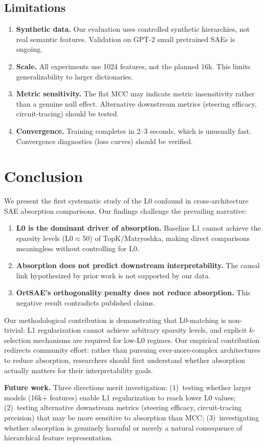 \documentclass{article}
\begin{document}
\subsection{Limitations}

\begin{enumerate}
    \item \textbf{Synthetic data.} Our evaluation uses controlled synthetic hierarchies, not real semantic features. Validation on GPT-2 small pretrained SAEs is ongoing.
    \item \textbf{Scale.} All experiments use 1024 features, not the planned 16k. This limits generalizability to larger dictionaries.
    \item \textbf{Metric sensitivity.} The flat MCC may indicate metric insensitivity rather than a genuine null effect. Alternative downstream metrics (steering efficacy, circuit-tracing) should be tested.
    \item \textbf{Convergence.} Training completes in 2--3 seconds, which is unusually fast. Convergence diagnostics (loss curves) should be verified.
\end{enumerate}

\section{Conclusion}

We present the first systematic study of the L0 confound in cross-architecture SAE absorption comparisons. Our findings challenge the prevailing narrative:
\begin{enumerate}
    \item \textbf{L0 is the dominant driver of absorption.} Baseline L1 cannot achieve the sparsity levels (L0$\approx$50) of TopK/Matryoshka, making direct comparisons meaningless without controlling for L0.
    \item \textbf{Absorption does not predict downstream interpretability.} The causal link hypothesized by prior work is not supported by our data.
    \item \textbf{OrtSAE's orthogonality penalty does not reduce absorption.} This negative result contradicts published claims.
\end{enumerate}

Our methodological contribution is demonstrating that L0-matching is non-trivial: L1 regularization cannot achieve arbitrary sparsity levels, and explicit $k$-selection mechanisms are required for low-L0 regimes. Our empirical contribution redirects community effort: rather than pursuing ever-more-complex architectures to reduce absorption, researchers should first understand whether absorption actually matters for their interpretability goals.

\textbf{Future work.} Three directions merit investigation: (1)~testing whether larger models (16k+ features) enable L1 regularization to reach lower L0 values; (2)~testing alternative downstream metrics (steering efficacy, circuit-tracing precision) that may be more sensitive to absorption than MCC; (3)~investigating whether absorption is genuinely harmful or merely a natural consequence of hierarchical feature representation.



\end{document}
